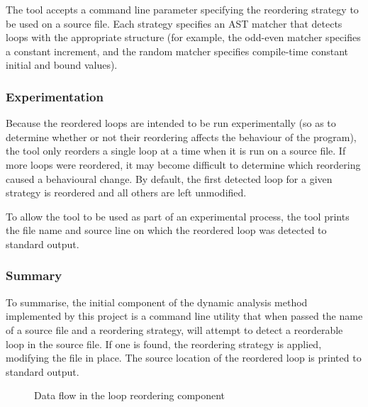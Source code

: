 \documentclass[journal]{IEEEtran}
\begin{document}
The tool accepts a command line parameter specifying the reordering strategy to
be used on a source file. Each strategy specifies an AST matcher that detects
loops with the appropriate structure (for example, the odd-even matcher
specifies a constant increment, and the random matcher specifies compile-time
constant initial and bound values).

\subsubsection{Experimentation}

Because the reordered loops are intended to be run experimentally (so as to
determine whether or not their reordering affects the behaviour of the program),
the tool only reorders a single loop at a time when it is run on a source file.
If more loops were reordered, it may become difficult to determine which
reordering caused a behavioural change. By default, the first detected loop for
a given strategy is reordered and all others are left unmodified.

To allow the tool to be used as part of an experimental process, the tool prints
the file name and source line on which the reordered loop was detected to
standard output.

\subsubsection{Summary}

To summarise, the initial component of the dynamic analysis method implemented
by this project is a command line utility that when passed the name of a source
file and a reordering strategy, will attempt to detect a reorderable loop in the
source file. If one is found, the reordering strategy is applied, modifying the
file in place. The source location of the reordered loop is printed to standard
output.

\begin{figure}[h] 
  \centering 
  \caption{Data flow in the loop reordering component}
  \label{fig:tool}
\end{figure}
\end{document}
